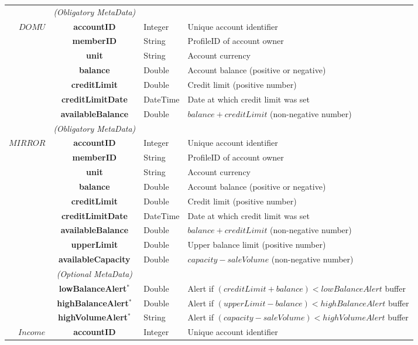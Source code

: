 \begin{table}[H]
\begin{centering}
{\begin{tabular}{ r | c | l | l }
\Xhline{1.5pt}
			 & \emph{(Obligatory MetaData)}& & \\
\cline{2-2}
$DOMU$		& {\bf accountID}			&Integer	& Unique account identifier \\
			& {\bf memberID}			&String	& ProfileID of account owner \\
			& {\bf unit}					&String	& Account currency \\
			& {\bf balance}				&Double	& Account balance (positive or negative) \\
			& {\bf creditLimit}			&Double	& Credit limit (positive number) \\
			& {\bf creditLimitDate}		&DateTime & Date at which credit limit was set \\
			& {\bf availableBalance}		&Double	& $balance + creditLimit$ (non-negative number) \\
\Xhline{1.5pt}
			 & \emph{(Obligatory MetaData)}& & \\
\cline{2-2}
$MIRROR$ 	& {\bf accountID}			&Integer	& Unique account identifier \\
			& {\bf memberID}			&String	& ProfileID of account owner \\
			& {\bf unit}					&String	& Account currency \\
			& {\bf balance}				&Double	& Account balance (positive or negative) \\
			& {\bf creditLimit}			&Double	& Credit limit (positive number) \\
			& {\bf creditLimitDate}		&DateTime & Date at which credit limit was set \\
			& {\bf availableBalance}		&Double	& $balance + creditLimit$ (non-negative number) \\
			& {\bf upperLimit}			&Double	& Upper balance limit (positive number) \\
			& {\bf availableCapacity}		&Double	& $capacity - saleVolume$ (non-negative number) \\
\cline{2-2}
			 & \emph{(Optional MetaData)}& & \\
\cline{2-2}
			& {\bf lowBalanceAlert$^*$}		&Double	& Alert if $(creditLimit + balance) < lowBalanceAlert$ buffer \\
			& {\bf highBalanceAlert$^*$}		&Double	& Alert if $(upperLimit - balance) < highBalanceAlert$ buffer \\
			& {\bf highVolumeAlert$^*$}		&String	& Alert if $(capacity - saleVolume) < highVolumeAlert$ buffer \\
\Xhline{1.5pt}
$Income$ 		& {\bf accountID}			&Integer	& Unique account identifier \\

\end{tabular}}
\end{centering}
\end{table}
